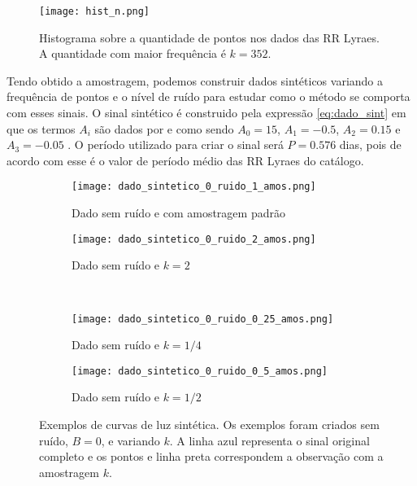 \begin{figure}[!ht]
  \centering
  \texttt{[image: hist\_n.png]}
  \caption[Histograma sobre quantidade de pontos.]{Histograma sobre a quantidade de pontos nos dados das RR Lyraes. A quantidade com maior frequência é $k = 352$.}
  \label{fig:histo_n}
\end{figure}

Tendo obtido a amostragem, podemos construir dados sintéticos variando a frequência de pontos e o nível de ruído para estudar como o método se comporta com esses sinais. O sinal sintético é construido pela expressão \ref{eq:dado_sint} em que os termos $A_i$ são dados por \citet{ce} e \citet{entropy} como sendo
$A_0 = 15$, $A_1 = -0.5$, $A_2 = 0.15$ e $A_3 = -0.05$ . O período utilizado para criar o sinal será $P = 0.576$ dias, pois de acordo com \citet{lyraes} esse é o valor de período médio das RR Lyraes do catálogo.

\begin{figure}[ht]
\centering
\begin{subfigure}{.5\textwidth}
  \centering
  \texttt{[image: dado\_sintetico\_0\_ruido\_1\_amos.png]}
  \caption{Dado sem ruído e com amostragem padrão}
  \label{fig:1amos}
\end{subfigure}%
\begin{subfigure}{.5\textwidth}
  \centering
  \texttt{[image: dado\_sintetico\_0\_ruido\_2\_amos.png]}
  \caption{Dado sem ruído e $k=2$}
  \label{fig:2amos}
  \end{subfigure}
\\
\begin{subfigure}{.5\textwidth}
  \centering
  \texttt{[image: dado\_sintetico\_0\_ruido\_0\_25\_amos.png]}
  \caption{Dado sem ruído e $k=1/4$}
  \label{fig:025amos}
\end{subfigure}%
\begin{subfigure}{.5\textwidth}
  \centering
  \texttt{[image: dado\_sintetico\_0\_ruido\_0\_5\_amos.png]}
  \caption{Dado sem ruído e $k=1/2$}
  \label{fig:05amos}
  \end{subfigure}
\caption[Curva de luz sintética.]{Exemplos de curvas de luz sintética. Os exemplos foram criados sem ruído, $B=0$, e variando $k$. A linha azul representa o sinal original completo e os pontos e linha preta correspondem a observação com a amostragem $k$.}
\label{fig:exemplo_curva_luz}
\end{figure}


